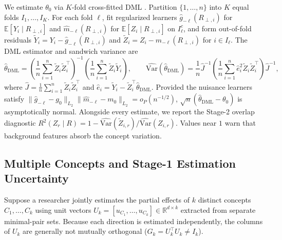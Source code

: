 \documentclass[11pt]{article}
\begin{document}
We estimate $\theta_0$ via $K$-fold cross-fitted DML \citep{chernozhukov2018double}. Partition $\{1, \dots, n\}$ into $K$ equal folds $I_1, \dots, I_K$. For each fold $\ell$, fit regularized learners $\hat{g}_{-\ell}(R_{\perp, i})$ for $\mathbb{E}[Y_i \mid R_{\perp, i}]$ and $\hat{m}_{-\ell}(R_{\perp, i})$ for $\mathbb{E}[Z_i \mid R_{\perp, i}]$ on $I_\ell^c$, and form out-of-fold residuals $\tilde{Y}_i = Y_i - \hat{g}_{-\ell}(R_{\perp, i})$ and $\tilde{Z}_i = Z_i - \hat{m}_{-\ell}(R_{\perp, i})$ for $i \in I_\ell$. The DML estimator and sandwich variance are
\begin{equation}\label{eq:dml}
\hat{\theta}_{\mathrm{DML}} = \left(\frac{1}{n}\sum_{i=1}^n \tilde{Z}_i \tilde{Z}_i^\top\right)^{-1}\left(\frac{1}{n}\sum_{i=1}^n \tilde{Z}_i \tilde{Y}_i\right), \qquad \widehat{\mathrm{Var}}(\hat{\theta}_{\mathrm{DML}}) = \frac{1}{n}\hat{J}^{-1}\left(\frac{1}{n}\sum_{i=1}^n \hat{e}_i^2 \tilde{Z}_i \tilde{Z}_i^\top\right)\hat{J}^{-1},
\end{equation}
where $\hat{J} = \frac{1}{n}\sum_{i=1}^n \tilde{Z}_i \tilde{Z}_i^\top$ and $\hat{e}_i = \tilde{Y}_i - \tilde{Z}_i^\top \hat{\theta}_{\mathrm{DML}}$. Provided the nuisance learners satisfy $\|\hat{g}_{-\ell} - g_0\|_{L_2}\|\hat{m}_{-\ell} - m_0\|_{L_2} = o_P(n^{-1/2})$, $\sqrt{n}(\hat{\theta}_{\mathrm{DML}} - \theta_0)$ is asymptotically normal. Alongside every estimate, we report the Stage-2 overlap diagnostic $R^2(Z_r \mid R) = 1 - \widehat{\mathrm{Var}}(\tilde{Z}_{i,r})/\widehat{\mathrm{Var}}(Z_{i,r})$. Values near $1$ warn that background features absorb the concept variation.

\subsection{Multiple Concepts and Stage-1 Estimation Uncertainty}

Suppose a researcher jointly estimates the partial effects of $k$ distinct concepts $C_1, \dots, C_k$ using unit vectors $U_k = [u_{C_1}, \dots, u_{C_k}] \in \mathbb{R}^{d \times k}$ extracted from separate minimal-pair sets. Because each direction is estimated independently, the columns of $U_k$ are generally not mutually orthogonal ($G_k = U_k^\top U_k \neq I_k$).
\end{document}
